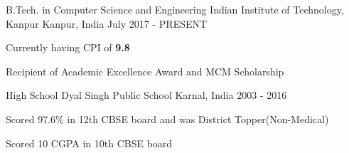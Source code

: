 \begin{cventries}
  \cventry
    {B.Tech. in Computer Science and Engineering}
    {Indian Institute of Technology, Kanpur}
    {Kanpur, India}
    {July 2017 - PRESENT}
    {
      \begin{cvitems}
        \item {Currently having CPI of \textbf{9.8}}
        \item {Recipient of Academic Excellence Award and MCM Scholarship}
      \end{cvitems}
    }
    \cventry
    {High School}
    {Dyal Singh Public School}
    {Karnal, India}
    {2003 - 2016}
    {
      \begin{cvitems}
        \item {Scored 97.6\% in 12th CBSE board and was District Topper(Non-Medical)}
        \item {Scored 10 CGPA in 10th CBSE board}
      \end{cvitems}
    }
\end{cventries}

